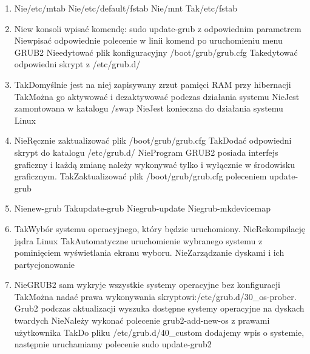\begin{enumerate}
	\item {}%
	{Nie}{/etc/mtab}%
	{Nie}{/etc/default/fstab}%
	{Nie}{/mnt}%
	{Tak}{/etc/fstab}
	
	\newpage
	
	\item {}%
	{Nie}{w konsoli wpisać komendę: sudo update-grub z odpowiednim parametrem}%
	{Nie}{wpisać odpowiednie polecenie w linii komend po uruchomieniu menu GRUB2}%
	{Nie}{edytować plik konfiguracyjny /boot/grub/grub.cfg}%
	{Tak}{edytować odpowiedni skrypt z /etc/grub.d/}

	\item {}%
	{Tak}{Domyślnie jest na niej zapisywany zrzut pamięci RAM przy hibernacji}%
	{Tak}{Można go aktywować i dezaktywować podczas działania systemu}%
	{Nie}{Jest zamontowana w katalogu /swap}%
	{Nie}{Jest konieczna do działania systemu Linux}
	
	\item {}%
	{Nie}{Ręcznie zaktualizować plik /boot/grub/grub.cfg}%
	{Tak}{Dodać odpowiedni skrypt do katalogu /etc/grub.d/}%
	{Nie}{Program GRUB2 posiada interfejs graficzny i każdą zmianę należy wykonywać tylko i wyłącznie w środowisku graficznym.}%
	{Tak}{Zaktualizować plik /boot/grub/grub.cfg poleceniem update-grub}

	\item {}%
	{Nie}{new-grub}%
	{Tak}{update-grub}%
	{Nie}{grub-update}%
	{Nie}{grub-mkdevicemap}
	
	\item {}%
	{Tak}{Wybór systemu operacyjnego, który będzie uruchomiony.}%
	{Nie}{Rekompilację jądra Linux}%
	{Tak}{Automatyczne uruchomienie wybranego systemu z pominięciem wyświetlania ekranu wyboru.}%
	{Nie}{Zarządzanie dyskami i ich partycjonowanie}

	\item {}%
	{Nie}{GRUB2 sam wykryje wszystkie systemy operacyjne bez konfiguracji}%
	{Tak}{Można nadać prawa wykonywania skryptowi:/etc/grub.d/30\_os-prober. Grub2 podczas aktualizacji wyszuka dostępne systemy operacyjne na dyskach twardych}%
	{Nie}{Należy wykonać polecenie grub2-add-new-os z prawami użytkownika}%
	{Tak}{Do pliku /etc/grub.d/40\_custom dodajemy wpis o systemie, następnie uruchamiamy polecenie sudo update-grub2}
	

\end{enumerate}
